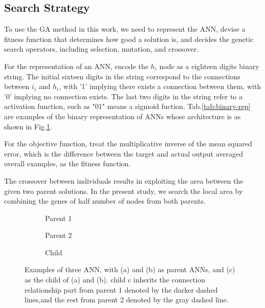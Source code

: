 

\subsection{Search Strategy}
To use the GA method in this work, we need to represent the ANN, devise a
fitness function that determines how good a solution is, and decides the
genetic search operators, including selection, mutation, and crossover.

For the representation of an ANN, encode the $h_i$ node as a eighteen digits
binary string. The initial sixteen digits in the string correspond to the
connections between $i_i$ and $h_i$, with '1' implying there exists a
connection between them, with '0' implying no connection exists. The last two
digits in the string refer to a activation function, such as "01" means a
sigmoid fuction.  Tab.\ref{tab:binary-rep} are examples of the binary
representation of ANNs whose architecture is as shown in
Fig.\ref{fig:anns}. 

For the objective function, treat the multiplicative inverse of the mean
squared error, which is the difference between the target and actual output
averaged overall examples, as the fitness function.

The crossover between individuals results in exploiting the area between the
given two parent solutions. In the present study, we search the local area by
combining the genes of half number of nodes from both parents.


\begin{figure}[!tb]
	\centering
	\begin{subfigure}[b]{1.0\linewidth}
		\centering
		
		\caption{Parent 1}
	\end{subfigure}
	\newline
	\begin{subfigure}[b]{1.0\linewidth}
		\centering
		
		\caption{Parent 2}
	\end{subfigure}
	\newline
	\begin{subfigure}[b]{1.0\linewidth}
		\centering
		
		\caption{Child}
	\end{subfigure}
	\caption{Examples of three ANN, with (a) and (b) as parent ANNs, and (c) as
		the child of (a) and (b). child c inherits the connection relationship
		part from parent 1 denoted by the darker dashed lines,and the rest from
		parent 2 denoted by the gray dashed line.}
		\label{fig:anns}
\end{figure}


